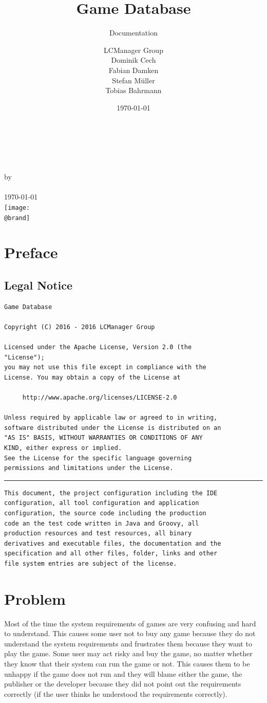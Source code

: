 \documentclass[12pt]{scrreprt}
\title{Game Database}
\subtitle{Documentation}
\author{LCManager Group\\Dominik Cech\\Fabian Damken\\Stefan Müller\\Tobias Bahrmann}
\date{\today}
\makeatletter
\def\@brand{../../gdb-web-control/src/main/resources/static/images/brand/brand_512.png}
\renewcommand\maketitle{%
	\begin{center}
		\thispagestyle{empty}
		\textsc{\LARGE}\\[2cm]
		\textsc{\Huge \@title}\\[1cm]
		\textsf{\normalsize \@subtitle}\\[1cm]
		\textsf{\small by}\\[1.5cm]
		\textsc{\large \@author}\\[0.25cm]
		\textsc{\large \today}\\[1.75cm]
		\texttt{[image: \\@brand]}
	\end{center}
}
\makeatother
\begin{document}
	\maketitle
	\tableofcontents

	\chapter{Preface}
		\label{ch:preface}

		\section{Legal Notice}
			\label{sec:preface_legal_notice}

			\begin{verbatim}
Game Database

Copyright (C) 2016 - 2016 LCManager Group

Licensed under the Apache License, Version 2.0 (the
"License");
you may not use this file except in compliance with the
License. You may obtain a copy of the License at

     http://www.apache.org/licenses/LICENSE-2.0

Unless required by applicable law or agreed to in writing,
software distributed under the License is distributed on an
"AS IS" BASIS, WITHOUT WARRANTIES OR CONDITIONS OF ANY
KIND, either express or implied.
See the License for the specific language governing
permissions and limitations under the License.
			\end{verbatim}

			\rule{\linewidth}{1pt}

			\begin{verbatim}
This document, the project configuration including the IDE
configuration, all tool configuration and application
configuration, the source code including the production
code an the test code written in Java and Groovy, all
production resources and test resources, all binary
derivatives and executable files, the documentation and the
specification and all other files, folder, links and other
file system entries are subject of the license.
			\end{verbatim}

	\chapter{Problem}
		\label{ch:problem}

		Most of the time the system requirements of games are very confusing and hard to understand. This causes some user not to buy any game because they do not understand the system requirements and frustrates them because they want to play the game. Some user may act risky and buy the game, no matter whether they know that their system can run the game or not. This causes them to be unhappy if the game does not run and they will blame either the game, the publisher or the developer because they did not point out the requirements correctly (if the user thinks he understood the requirements correctly).
\end{document}
